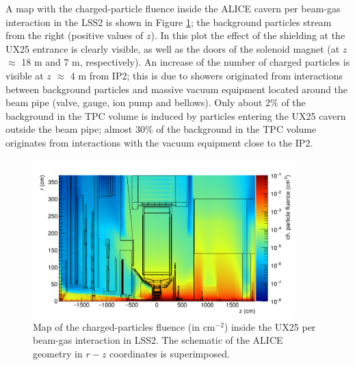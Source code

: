 
\noindent A map with the charged-particle fluence inside the ALICE cavern per beam-gas interaction in the LSS2 is shown in Figure \ref{bkgd_ch}; the background particles stream from the right (positive values of $z$). In this plot the effect of the shielding at the UX25 entrance is clearly visible, as well as the doors of the solenoid magnet (at $z$ $\approx$ 18 m and 7 m, respectively). An increase of the number of charged particles is visible at $z$ $\approx$ 4 m from IP2; this is due to showers originated from interactions between background particles and massive vacuum equipment located around the beam pipe (valve, gauge, ion pump and bellows). Only about 2\% of the background in the TPC volume is induced by particles entering the UX25 cavern outside the beam pipe; almost 30\% of the background in the TPC volume originates from interactions with the vacuum equipment close to the IP2.


\begin{figure}[H]
\begin{center}
\includegraphics[width=0.9\textwidth]{figures/SensorSimulation/chargedBkg2.png}	
\end{center}
\caption{Map of the charged-particles fluence (in cm$^{-2}$) inside the UX25 per beam-gas interaction in LSS2. The schematic of the ALICE geometry in $r-z$ coordinates is superimposed.}
\label{bkgd_ch} 
\end{figure}



